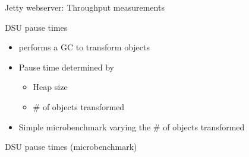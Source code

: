 \begin{frame}{Jetty webserver: Throughput measurements}%
\begin{center}
\centering{}
\end{center}
\end{frame}

\begin{frame}{DSU pause times}%
\begin{itemize}
\item \DSU{} performs a GC to transform objects
\item Pause time determined by
  \begin{itemize}
  \item Heap size
  \item \# of objects transformed
  \end{itemize}
\item Simple microbenchmark varying the \# of objects transformed
\end{itemize}
\end{frame}

\begin{frame}[shrink=5]{DSU pause times (microbenchmark)}%
\begin{center}
\hspace*{19mm}
\end{center}
\end{frame}

